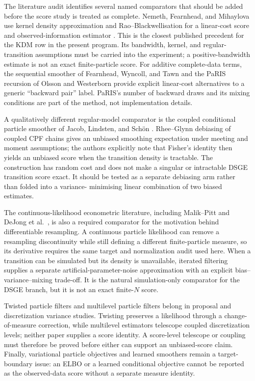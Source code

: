 \documentclass[11pt]{article}
\begin{document}
The literature audit identifies several named comparators that should be added
before the score study is treated as complete. Nemeth, Fearnhead, and
Mihaylova use kernel density approximation and Rao--Blackwellisation for a
linear-cost score and observed-information estimator
\citep{nemeth2016score}. This is the closest published precedent for the KDM
row in the present program. Its bandwidth, kernel, and regular-transition
assumptions must be carried into the experiment; a positive-bandwidth estimate
is not an exact finite-particle score. For additive complete-data terms, the
sequential smoother of Fearnhead, Wyncoll, and Tawn
\citep{fearnhead2010smoothing} and the PaRIS recursion of Olsson and Westerborn
\citep{olsson2017paris} provide explicit linear-cost alternatives to a generic
``backward pair'' label. PaRIS's number of backward draws and its mixing
conditions are part of the method, not implementation details.

A qualitatively different regular-model comparator is the coupled conditional
particle smoother of Jacob, Lindsten, and Schön
\citep{jacob2020coupled}. Rhee--Glynn debiasing of coupled CPF chains gives an
unbiased smoothing expectation under meeting and moment assumptions; the
authors explicitly note that Fisher's identity then yields an unbiased score
when the transition density is tractable. The construction has random cost and
does not make a singular or intractable DSGE transition score exact. It should
be tested as a separate debiasing arm rather than folded into a variance-
minimising linear combination of two biased estimates.

The continuous-likelihood econometric literature, including Malik--Pitt and
DeJong et al.\ \citep{malik2011continuous,dejong2013efficient}, is also a
required comparator for the motivation behind differentiable resampling. A
continuous particle likelihood can remove a resampling discontinuity while
still defining a different finite-particle measure, so its derivative requires
the same target and normalization audit used here. When a transition can be
simulated but its density is unavailable, iterated filtering
\citep{ionides2011iterated} supplies a separate artificial-parameter-noise
approximation with an explicit bias--variance--mixing trade-off. It is the
natural simulation-only comparator for the DSGE branch, but it is not an exact
finite-$N$ score.

Twisted particle filters \citep{whiteley2014twisted} and multilevel particle
filters \citep{jasra2017multilevel} belong in proposal and discretization
variance studies. Twisting preserves a likelihood through a change-of-measure
correction, while multilevel estimators telescope coupled discretization
levels; neither paper supplies a score identity. A score-level telescope or
coupling must therefore be proved before either can support an unbiased-score
claim. Finally, variational particle objectives and learned smoothers remain a
target-boundary issue: an ELBO or a learned conditional objective cannot be
reported as the observed-data score without a separate measure identity.
\end{document}
